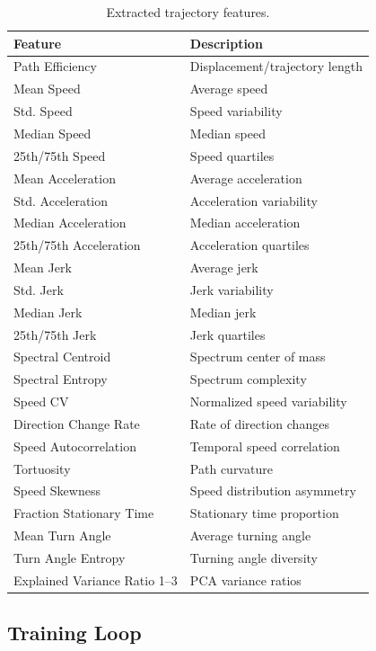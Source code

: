 \documentclass{article}
\begin{document}
\begin{table}[!t]
\centering
\scriptsize
\caption{Extracted trajectory features.}
\label{tab:features}
\begin{tabular}{p{3.2cm} p{3.6cm}}
\toprule
\textbf{Feature} & \textbf{Description} \\
\midrule
Path Efficiency & Displacement/trajectory length \\
Mean Speed & Average speed \\
Std. Speed & Speed variability \\
Median Speed & Median speed \\
25th/75th Speed & Speed quartiles \\
Mean Acceleration & Average acceleration \\
Std. Acceleration & Acceleration variability \\
Median Acceleration & Median acceleration \\
25th/75th Acceleration & Acceleration quartiles \\
Mean Jerk & Average jerk \\
Std. Jerk & Jerk variability \\
Median Jerk & Median jerk \\
25th/75th Jerk & Jerk quartiles \\
Spectral Centroid & Spectrum center of mass \\
Spectral Entropy & Spectrum complexity \\
Speed CV & Normalized speed variability \\
Direction Change Rate & Rate of direction changes \\
Speed Autocorrelation & Temporal speed correlation \\
Tortuosity & Path curvature \\
Speed Skewness & Speed distribution asymmetry \\
Fraction Stationary Time & Stationary time proportion \\
Mean Turn Angle & Average turning angle \\
Turn Angle Entropy & Turning angle diversity \\
Explained Variance Ratio 1--3 & PCA variance ratios \\
\bottomrule
\end{tabular}
\end{table}

\subsection{Training Loop}
\end{document}
